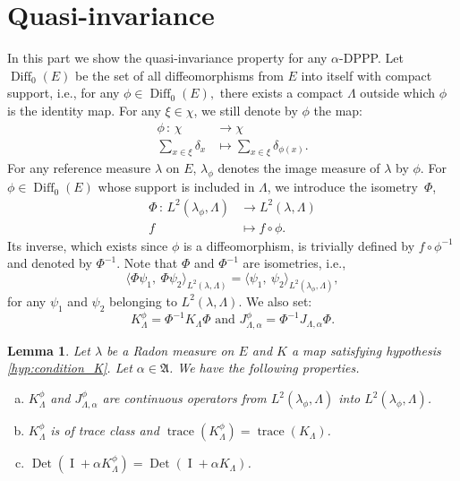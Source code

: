 \documentclass[11pt,a4paper]{amsart}
\newtheorem{Lemma}{Lemma}
\begin{document}
\section{Quasi-invariance}
\label{Quasi-invariance}
In this part we show the quasi-invariance property for any
$\alpha$-DPPP.  Let ${\operatorname{Diff}} _{0}(E)$ be the set of all diffeomorphisms
from $E$ into itself with compact support, i.e., for any $\phi\in
{\operatorname{Diff}}_0(E),$ there exists a compact $\Lambda$ outside which $\phi$ is
the identity map.  For any $\xi \in \chi$, we still denote by $\phi$
the map:
\begin{align*}
  \phi\, :\, \chi & \longrightarrow \chi\\
  \sum_{x \in \xi}\delta_{x}&\longmapsto \sum_{x \in
    \xi}{\delta_{\phi(x)}} .
\end{align*}
For any reference measure $\lambda$ on $E$, $\lambda_{\phi}$ denotes
the image measure of $\lambda$ by $\phi$.  For $\phi \in {\operatorname{Diff}} _0(E)$
whose support is included in $\Lambda$, we introduce the
isometry~$\Phi$,
\begin{align*}
  \Phi \, :\, L^2(\lambda_{\phi}, \Lambda)& \longrightarrow L^2(\lambda, \Lambda)\\
  f &\longmapsto f\circ \phi.
\end{align*}
Its inverse, which exists since $\phi$ is a diffeomorphism, is
trivially defined by $f\circ \phi^{-1}$ and denoted by
$\Phi^{-1}$. Note that $\Phi$ and $\Phi^{-1}$ are isometries, i.e.,
\begin{equation*}
  \langle \Phi \psi_1 ,\ \Phi \psi_2\rangle_{L^2({\lambda,\Lambda})}= \langle \psi_1 ,\ \psi_2\rangle_{L^2({\lambda_{\phi},\Lambda})}, 
\end{equation*}
for any $\psi_1$ and $\psi_2$ belonging to $L^2(\lambda, \Lambda)$.
We also set:
\begin{equation*}
  K^{\phi}_{\Lambda}=\Phi^{-1}K_{\Lambda}\Phi \text{ and }
  J^{\phi}_{\Lambda,\alpha}=\Phi^{-1}J_{\Lambda,\alpha}\Phi.
\end{equation*}
\begin{Lemma}
  \label{thm:operateurs}
  Let $\lambda$ be a Radon measure on $E$ and $K$ a map satisfying
  hypothesis \ref{hyp:condition_K}.  Let $\alpha \in {{\mathfrak A}}$. We have the
  following properties.
  \begin{enumerate}[a)]
  \item \label{item:4} $K^{\phi}_{\Lambda}$ and
    $J^{\phi}_{\Lambda,\alpha}$ are continuous operators from
    $L^2(\lambda_{\phi}, \Lambda)$ into $L^2(\lambda_{\phi},
    \Lambda)$.
  \item \label{item:5} $K^{\phi}_{\Lambda}$ is of trace class and
    ${\operatorname{trace}}(K^{\phi}_{\Lambda})={\operatorname{trace}}(K_\Lambda)$.
  \item \label{item:8} ${\operatorname{Det}}({\operatorname{I}}+\alpha
    K_{\Lambda}^{\phi})={\operatorname{Det}}({\operatorname{I}}+\alpha K_{\Lambda})$.
  \end{enumerate}
\end{Lemma}
\end{document}
